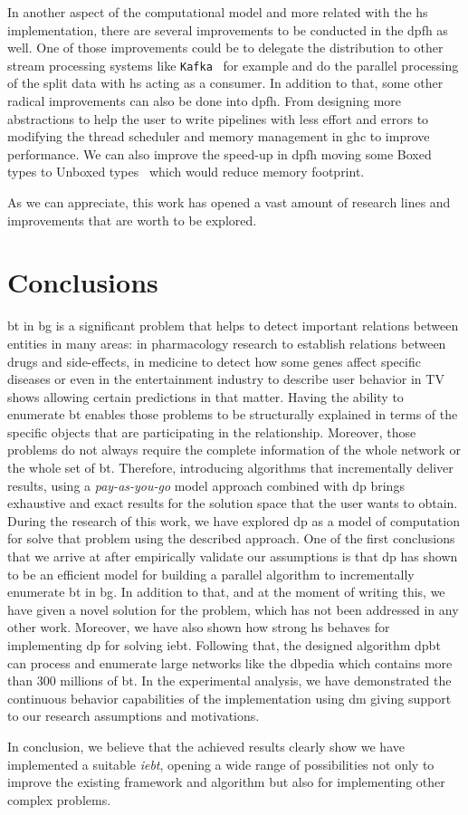 In another aspect of the computational model and more related with the \acrlong{hs} implementation, there are several improvements to be conducted in the \acrlong{dpfh} as well. 
One of those improvements could be to delegate the distribution to other stream processing systems like \texttt{Kafka}~\cite{kafka} for example and do the parallel processing of the split data with \acrlong{hs} acting as a consumer.
In addition to that, some other radical improvements can also be done into \acrlong{dpfh}. From designing more abstractions to help the user to write pipelines with less effort and errors to modifying the thread scheduler and memory management in \acrshort{ghc} to improve performance. 
We can also improve the speed-up in \acrlong{dpfh} moving some Boxed types to Unboxed types~\cite{hs-unbox} which would reduce memory footprint.

As we can appreciate, this work has opened a vast amount of research lines and improvements that are worth to be explored.

\section{Conclusions}
\acrlong{bt} in \acrlong{bg} is a significant problem that helps to detect important relations between entities in many areas: in pharmacology research to establish relations between drugs and side-effects, in medicine to detect how some genes affect specific diseases
or even in the entertainment industry to describe user behavior in TV shows allowing certain predictions in that matter.
Having the ability to enumerate \acrlong{bt} enables those problems to be structurally explained in terms of the specific objects that are participating in the relationship.  
Moreover, those problems do not always require the complete information of the whole network or the whole set of \acrlong{bt}. 
Therefore, introducing algorithms that incrementally deliver results, using a \emph{pay-as-you-go} model approach combined with \acrshort{dp} brings exhaustive and exact results for the solution space that the user wants to obtain. 
During the research of this work, we have explored \acrfull{dp} as a model of computation for solve that problem using the described approach. 
One of the first conclusions that we arrive at after empirically validate our assumptions is that \acrlong{dp} has shown to be an efficient model for building a parallel algorithm to incrementally enumerate \acrlong{bt} in \acrlong{bg}. 
In addition to that, and at the moment of writing this, we have given a novel solution for the problem, which has not been addressed in any other work.
Moreover, we have also shown how strong \acrfull{hs} behaves for implementing \acrfull{dp} for solving \acrlong{iebt}. 
Following that, the designed algorithm \acrshort{dpbt} can process and enumerate large networks like the \acrlong{dbpedia} which contains more than $300$ millions of \acrlong{bt}.
In the experimental analysis, we have demonstrated the continuous behavior capabilities of the implementation using \acrlong{dm} giving support to our research assumptions and motivations. 

In conclusion, we believe that the achieved results clearly show we have implemented a suitable \emph{\acrlong{iebt}}, opening a wide range of possibilities not only to improve the existing framework and algorithm but also for implementing other complex problems.
